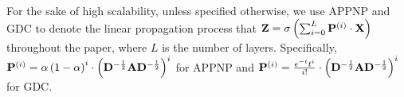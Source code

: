 For the sake of high scalability, unless specified otherwise, we use APPNP and GDC to denote the linear propagation process that $\mathbf{Z} =\sigma\left(\sum_{i=0}^L \P^{(i)} \cdot \X\right)$ throughout the paper, where $L$ is the number of layers. Specifically, $\P^{(i)}=\alpha \left( 1-\alpha \right)^i \cdot \left(\mathbf{D}^{-\frac{1}{2}}\mathbf{A} \mathbf{D}^{-\frac{1}{2}} \right)^i$ for APPNP and $\P^{(i)}=\frac{e^{-t} t^i}{i!}\cdot \left(\mathbf{D}^{-\frac{1}{2}}\mathbf{A} \mathbf{D}^{-\frac{1}{2}} \right)^i$ for GDC. 



